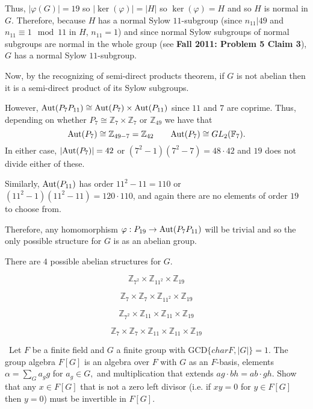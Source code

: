 \documentclass[12pt]{Qual}
\begin{document}
\begin{solution}
Thus, $|\varphi(G)|=19$ so $|\ker(\varphi)|=|H|$ so $\ker(\varphi)=H$ and so $H$ is normal in $G$. Therefore, because $H$ has a normal Sylow $11$-subgroup (since $n_{11}|49$ and $n_{11}\equiv 1\mod 11$ in $H$, $n_{11}=1$) and since normal Sylow subgroups of normal subgroups are normal in the whole group (see \textbf{Fall 2011: Problem 5 Claim 3}), $G$ has a normal Sylow $11$-subgroup.

Now, by the recognizing of semi-direct products theorem, if $G$ is not abelian then it is a semi-direct product of its Sylow subgroups.

However, $\text{Aut}(P_7P_{11})\cong\text{Aut}(P_7)\times\text{Aut}(P_{11})$ since $11$ and $7$ are coprime. Thus, depending on whether $P_7\cong\mathbb{Z}_7\times\mathbb{Z}_7$ or $\mathbb{Z}_{49}$ we have that $$\text{Aut}(P_7)\cong\mathbb{Z}_{49-7}=\mathbb{Z}_{42}\qquad \text{Aut}(P_7)\cong GL_2(\mathbb{F}_7).$$ In either case, $|\text{Aut}(P_7)|=42$ or $(7^2-1)(7^2-7)=48\cdot 42$ and $19$ does not divide either of these.

Similarly, $\text{Aut}(P_{11})$ has order $11^2-11=110$ or $(11^2-1)(11^2-11)=120\cdot 110$, and again there are no elements of order $19$ to choose from.

Therefore, any homomorphism $\varphi:P_{19}\to\text{Aut}(P_7P_{11})$ will be trivial and so the only possible structure for $G$ is as an abelian group.

There are $4$ possible abelian structures for $G$.

\begin{center}
    \begin{framed}
    $$\mathbb{Z}_{7^2}\times\mathbb{Z}_{11^2}\times\mathbb{Z}_{19}$$

    $$\mathbb{Z}_7\times\mathbb{Z}_7\times\mathbb{Z}_{11^2}\times\mathbb{Z}_{19}$$

    $$\mathbb{Z}_{7^2}\times\mathbb{Z}_{11}\times \mathbb{Z}_{11}\times\mathbb{Z}_{19}$$

    $$\mathbb{Z}_7\times\mathbb{Z}_7\times\mathbb{Z}_{11}\times \mathbb{Z}_{11}\times\mathbb{Z}_{19}$$
    \end{framed}
\end{center}



\end{solution}
\newpage



\begin{problem} $\,$
Let $F$ be a finite field and $G$ a finite group with GCD$\{char F,|G|\}=1$. The group algebra $F[G]$ is an algebra over $F$ with $G$ as an $F$-basis, elements $\alpha=\sum_Ga_gg$ for $a_g\in G,$ and multiplication that extends $ag\cdot bh=ab\cdot gh$. Show that any $x\in F[G]$ that is not a zero left divisor (i.e. if $xy=0$ for $y\in F[G]$ then $y=0$) must be invertible in $F[G].$
\end{problem}
\end{document}
